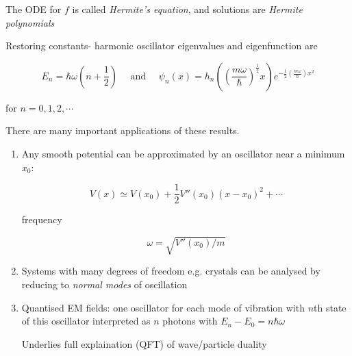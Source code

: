 \documentclass[a4paper]{article}
\begin{document}
The ODE for $ f $ is called \emph{Hermite's equation}, and solutions are \emph{Hermite polynomials}

Restoring constants- harmonic oscillator eigenvalues and eigenfunction are

\[ E_{n} = \hbar \omega  (n + \frac{1}{2}) \quad \text{ and } \quad \psi_{n}(x) = h_{n} \left(  \left(\frac{m \omega}{\hbar}   \right)^{\frac{1}{2}}  x \right)  e^{-\frac{1}{2} \left( \frac{m \omega}{\hbar} \right) x^{2} }     \]

for $ n = 0,1,2,\cdots $

There are many important applications of these results.

\begin{enumerate}
	\item Any smooth potential can be approximated by an oscillator near a minimum $ x_{0} $:
	
	\[ V(x) \simeq V(x_{0}) + \frac{1}{2} V''(x_{0}) (x - x_{0})^{2} + \cdots \]
	
	frequency
	
	\[ \omega = \sqrt{V''(x_{0}) / m} \]
	
	\item Systems with many degrees of freedom e.g. crystals can be analysed by reducing to \emph{normal modes} of oscillation
	
	\item Quantised EM fields: one oscillator for each mode of vibration with $ n $th state of this oscillator interpreted as $ n $ photons with $ E_{n} - E_{0} = n \hbar \omega $
	
	Underlies full explaination (QFT) of wave/particle duality
	
\end{enumerate}











  
\end{document}

